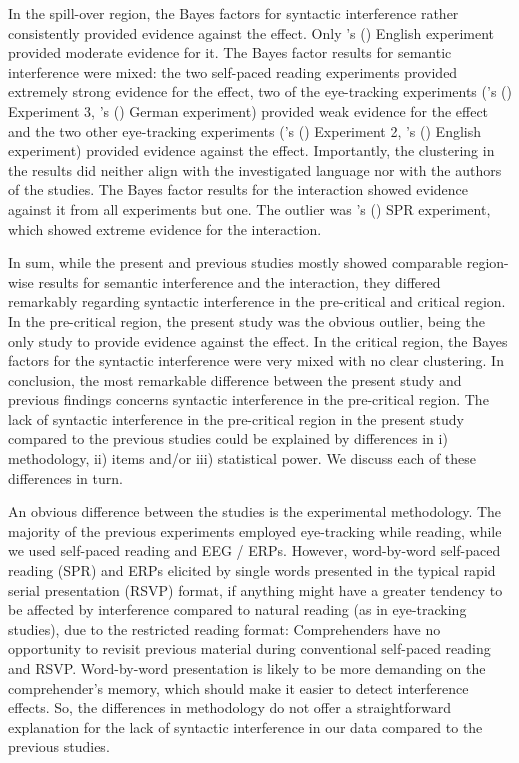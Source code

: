 \documentclass[review,preprint,12pt,authoryear,floatsintext]{elsarticle}
\begin{document}
{{In the spill-over region, the Bayes factors for syntactic interference rather consistently provided evidence against the effect. Only \citeauthor{mertzen}'s (\citeyear{mertzen}) English experiment provided moderate evidence for it. The Bayes factor results for semantic interference were mixed: the two self-paced reading experiments provided extremely strong evidence for the effect, two of the eye-tracking experiments (\citeauthor{vandyke07}'s (\citeyear{vandyke07}) Experiment 3, \citeauthor{mertzen}'s (\citeyear{mertzen}) German experiment) provided weak evidence for the effect and the two other eye-tracking experiments (\citeauthor{vandyke07}'s (\citeyear{vandyke07}) Experiment 2, \citeauthor{mertzen}'s (\citeyear{mertzen}) English experiment) provided evidence against the effect. Importantly, the clustering in the results did neither align with the investigated language nor with the authors of the studies. The Bayes factor results for the interaction showed evidence against it from all experiments but one. The outlier was \citeauthor{vandyke07}'s (\citeyear{vandyke07}) SPR experiment, which showed extreme evidence for the interaction.

In sum, while the present and previous studies mostly showed comparable region-wise results for semantic interference and the interaction, they differed remarkably regarding syntactic interference in the pre-critical and critical region. In the pre-critical region, the present study was the obvious outlier, being the only study to provide evidence against the effect. In the critical region, the Bayes factors for the syntactic interference were very mixed with no clear clustering. In conclusion, the most remarkable difference between the present study and previous findings concerns syntactic interference in the pre-critical region. The lack of syntactic interference in the pre-critical region in the present study compared to the previous studies could be explained by differences in i) methodology, ii) items and/or iii) statistical power. We discuss each of these differences in turn.
}

An obvious difference between the studies is the experimental methodology. The majority of the previous experiments employed eye-tracking while reading, while we used self-paced reading and EEG / ERPs. However, word-by-word self-paced reading (SPR) and ERPs elicited by single words presented in the typical rapid serial presentation (RSVP) format, if anything might have a greater tendency to be affected by interference compared to natural reading (as in eye-tracking studies), due to the restricted reading format: Comprehenders have no opportunity to revisit previous material during conventional self-paced reading \citep[but see][]{BSPR} and RSVP. Word-by-word presentation is likely to be more demanding on the comprehender's memory, which should make it easier to detect interference effects. So, the differences in methodology do not offer a straightforward explanation for the lack of syntactic interference in our data compared to the previous studies.

}
\end{document}
